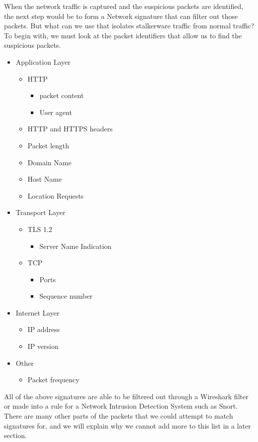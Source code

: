 \documentclass[acmtog]{acmart}
\begin{document}
When the network traffic is captured and the suspicious packets are identified, the next step would be to form a Network signature that can filter out those packets. But what can we use that isolates stalkerware traffic from normal traffic? To begin with, we must look at the packet identifiers that allow us to find the suspicious packets. 
\begin{itemize}
	\item Application Layer
	\begin{itemize}
		\item HTTP
		\begin{itemize}
			\item packet content
			\item User agent
		\end{itemize}
		\item HTTP and HTTPS headers
		\item Packet length
		\item Domain Name
		\item Host Name
		\item Location Requests
	\end{itemize}
	\item Transport Layer
	\begin{itemize}
		\item TLS 1.2
		\begin{itemize}
			\item Server Name Indication
		\end{itemize}
		\item TCP
		\begin{itemize}
			\item Ports
			\item Sequence number
		\end{itemize}
	\end{itemize}
	\item Internet Layer
	\begin{itemize}
		\item IP address
		\item IP version
	\end{itemize}
	\item Other
	\begin{itemize}
		\item Packet frequency
	\end{itemize}
\end{itemize}

All of the above signatures are able to be filtered out through a Wireshark filter or made into a rule for a Network Intrusion Detection System such as Snort. There are many other parts of the packets that we could attempt to match signatures for, and we will explain why we cannot add more to this list in a later section.
\end{document}

